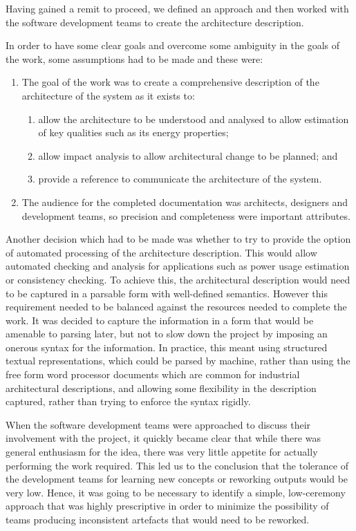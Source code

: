   Having gained a remit to proceed, we defined an approach and then worked with the software development teams to create the architecture description.

  In order to have some clear goals and overcome some ambiguity in the goals of the work, some assumptions had to be made and these were:

 \begin{enumerate}

\item The goal of the work was to create a comprehensive description of the architecture of the system as it exists to:
\begin{enumerate}
\item allow the architecture to be understood and analysed to allow estimation of key qualities such as its energy properties;
\item allow impact analysis to allow architectural change to be planned; and 
\item provide a reference to communicate the architecture of the system.
\end{enumerate}

\item The audience for the completed documentation was architects, designers and development teams, so precision and completeness were important attributes.

\end{enumerate}

  Another decision which had to be made was whether to try to provide the option of automated processing of the architecture description.  This would allow automated checking and analysis for applications such as power usage estimation or consistency checking.  To achieve this, the architectural description would need to be captured in a parsable form with well-defined semantics.  However this requirement needed to be balanced against the resources needed to complete the work.  It was decided to capture the information in a form that would be amenable to parsing later, but not to slow down the project by imposing an onerous syntax for the information.  In practice, this meant using structured textual representations, which could be parsed by machine, rather than using the free form word processor documents which are common for industrial architectural descriptions, and allowing some flexibility in the description captured, rather than trying to enforce the syntax rigidly.

When the software development teams were approached to discuss their involvement with the project, it quickly became clear that while there was general enthusiasm for the idea, there was very little appetite for actually performing the work required.  This led us to the conclusion that the tolerance of the development teams for learning new concepts or reworking outputs would be very low.  Hence, it was going to be necessary to identify a simple, low-ceremony approach that was highly prescriptive in order to minimize the possibility of teams producing inconsistent artefacts that would need to be reworked.

